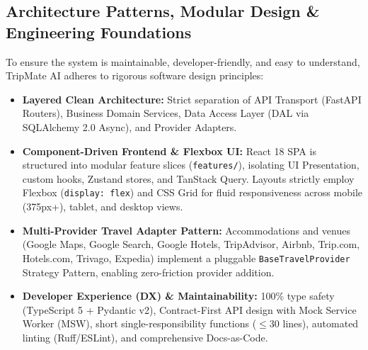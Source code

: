 \documentclass[11pt,a4paper]{article}
\begin{document}
\subsection{Architecture Patterns, Modular Design \& Engineering Foundations}
\label{sec:architecture_patterns}
To ensure the system is maintainable, developer-friendly, and easy to understand, TripMate AI adheres to rigorous software design principles:
\begin{itemize}[leftmargin=1.2em]
\item \textbf{Layered Clean Architecture:} Strict separation of API Transport (FastAPI Routers), Business Domain Services, Data Access Layer (DAL via SQLAlchemy 2.0 Async), and Provider Adapters.
\item \textbf{Component-Driven Frontend \& Flexbox UI:} React 18 SPA is structured into modular feature slices (\texttt{features/}), isolating UI Presentation, custom hooks, Zustand stores, and TanStack Query. Layouts strictly employ Flexbox (\texttt{display: flex}) and CSS Grid for fluid responsiveness across mobile (375px+), tablet, and desktop views.
\item \textbf{Multi-Provider Travel Adapter Pattern:} Accommodations and venues (Google Maps, Google Search, Google Hotels, TripAdvisor, Airbnb, Trip.com, Hotels.com, Trivago, Expedia) implement a pluggable \texttt{BaseTravelProvider} Strategy Pattern, enabling zero-friction provider addition.
\item \textbf{Developer Experience (DX) \& Maintainability:} 100\% type safety (TypeScript 5 + Pydantic v2), Contract-First API design with Mock Service Worker (MSW), short single-responsibility functions ($\le 30$ lines), automated linting (Ruff/ESLint), and comprehensive Docs-as-Code.
\end{itemize}
\end{document}
